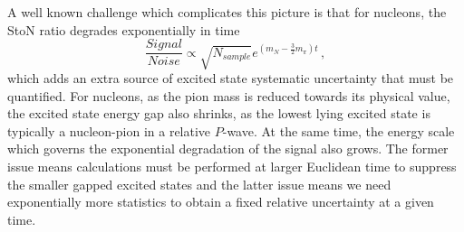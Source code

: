 A well known challenge which complicates this picture is that for nucleons, the StoN ratio degrades exponentially in time~\cite{Lepage:1989hd}
\begin{equation}
\frac{Signal}{Noise} \propto \sqrt{N_{sample}} e^{(m_N - \frac{3}{2}m_\pi)t}\, ,
\end{equation}
 which adds an extra source of excited state systematic uncertainty that must be quantified.
For nucleons, as the pion mass is reduced towards its physical value, the excited state energy gap also shrinks, as the lowest lying excited state is typically a nucleon-pion in a relative $P$-wave.  At the same time, the energy scale which governs the exponential degradation of the signal also grows.  The former issue means calculations must be performed at larger Euclidean time to suppress the smaller gapped excited states and the latter issue means we need exponentially more statistics to obtain a fixed relative uncertainty at a given time.
